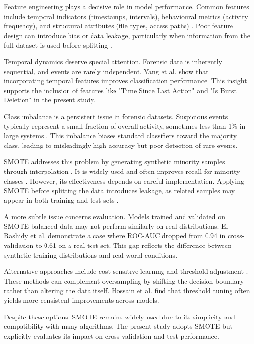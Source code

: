 Feature engineering plays a decisive role in model performance. Common features include temporal indicators (timestamps, intervals), behavioural metrics (activity frequency), and structural attributes (file types, access paths) \cite{ref37}. Poor feature design can introduce bias or data leakage, particularly when information from the full dataset is used before splitting \cite{ref38}.

Temporal dynamics deserve special attention. Forensic data is inherently sequential, and events are rarely independent. Yang et al. \cite{ref39} show that incorporating temporal features improves classification performance. This insight supports the inclusion of features like "Time Since Last Action" and "Is Burst Deletion" in the present study.

Class imbalance is a persistent issue in forensic datasets. Suspicious events typically represent a small fraction of overall activity, sometimes less than 1\% in large systems \cite{ref40}. This imbalance biases standard classifiers toward the majority class, leading to misleadingly high accuracy but poor detection of rare events.

SMOTE addresses this problem by generating synthetic minority samples through interpolation \cite{ref41}. It is widely used and often improves recall for minority classes \cite{ref42,ref43}. However, its effectiveness depends on careful implementation. Applying SMOTE before splitting the data introduces leakage, as related samples may appear in both training and test sets \cite{ref44}.

A more subtle issue concerns evaluation. Models trained and validated on SMOTE-balanced data may not perform similarly on real distributions. El-Rashidy et al. \cite{ref45} demonstrate a case where ROC-AUC dropped from 0.94 in cross-validation to 0.61 on a real test set. This gap reflects the difference between synthetic training distributions and real-world conditions.

Alternative approaches include cost-sensitive learning and threshold adjustment \cite{ref46}. These methods can complement oversampling by shifting the decision boundary rather than altering the data itself. Hossain et al. \cite{ref47} find that threshold tuning often yields more consistent improvements across models.

Despite these options, SMOTE remains widely used due to its simplicity and compatibility with many algorithms. The present study adopts SMOTE but explicitly evaluates its impact on cross-validation and test performance.

